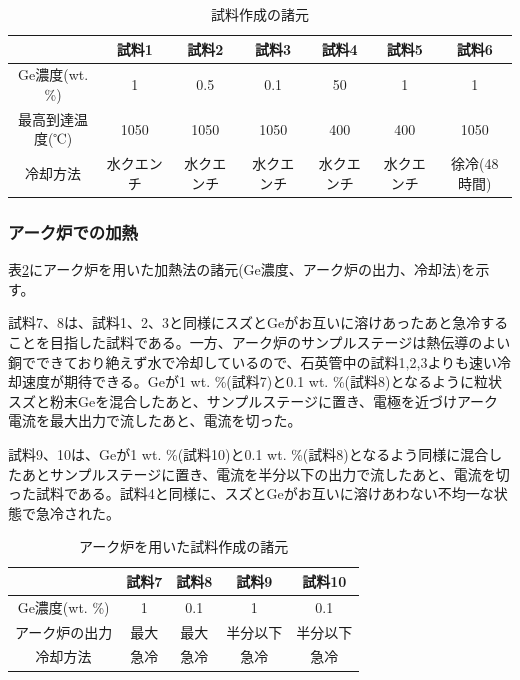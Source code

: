 \begin{table}[htb]
    \begin{center}
  \begin{tabular}{c|cccccc}
    & 試料1 & 試料2 & 試料3 & 試料4 & 試料5 & 試料6 \\ \hline
    Ge濃度(wt. \%)  & 1 & 0.5 &  0.1 & 50 & 1 & 1\\
   最高到達温度(℃)  & 1050　& 1050 &  1050 & 400& 400 & 1050 \\
    冷却方法 & 水クエンチ & 水クエンチ& 水クエンチ& 水クエンチ& 水クエンチ &徐冷(48時間)   \\
  \end{tabular}
  \caption{試料作成の諸元}
  \label{tab:sample_prep_elec}
    \end{center}
\end{table}

\subsubsection{アーク炉での加熱}
表\ref{tab:sample_prep_arc}にアーク炉を用いた加熱法の諸元(Ge濃度、アーク炉の出力、冷却法)を示す。

試料7、8は、試料1、2、3と同様にスズとGeがお互いに溶けあったあと急冷することを目指した試料である。一方、アーク炉のサンプルステージは熱伝導のよい銅でできており絶えず水で冷却しているので、石英管中の試料1,2,3よりも速い冷却速度が期待できる。Geが1 wt. \%(試料7)と0.1 wt. \%(試料8)となるように粒状スズと粉末Geを混合したあと、サンプルステージに置き、電極を近づけアーク電流を最大出力で流したあと、電流を切った。

試料9、10は、Geが1 wt. \%(試料10)と0.1 wt. \%(試料8)となるよう同様に混合したあとサンプルステージに置き、電流を半分以下の出力で流したあと、電流を切った試料である。試料4と同様に、スズとGeがお互いに溶けあわない不均一な状態で急冷された。
\begin{table}[htb]
    \begin{center}
  \begin{tabular}{c|cccc}
    & 試料7 & 試料8 & 試料9 & 試料10 \\ \hline
    Ge濃度(wt. \%)  & 1 & 0.1 &  1 & 0.1  \\
   アーク炉の出力  & 最大& 最大&  半分以下 & 半分以下\\
    冷却方法 & 急冷 & 急冷& 急冷& 急冷 \\
  \end{tabular}
  \caption{アーク炉を用いた試料作成の諸元}
  \label{tab:sample_prep_arc}
    \end{center}
\end{table}

